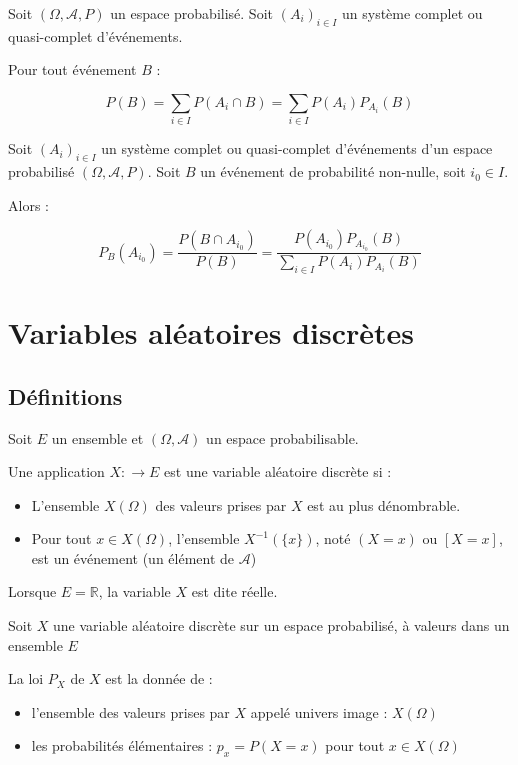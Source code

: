 \documentclass[a4paper,12pt]{book}
\newcommand{\Def}[2]{\begin{tcolorbox}[colback=white,colframe=red!10!green!20!blue!75!, title=Définition : #1]#2\end{tcolorbox}}
\newcommand{\Thr}[2]{\begin{tcolorbox}[sharp corners, colback=white,colframe=red!10!blue!30!green!75!, title=Théorème : #1]#2\end{tcolorbox}}
\def\R{\mathbb{R}}
\begin{document}
\Thr{Formule des probabilités totales}{Soit $(\Omega, \mathcal{A}, P)$ un espace probabilisé. Soit $(A_i)_{i\in I}$ un système complet ou quasi-complet d'événements.
\par Pour tout événement $B$ :
\par $$P(B)=\sum\limits_{i\in I}P(A_i\cap B)=\sum\limits_{i\in I}P(A_i)P_{A_i}(B)$$}
\Thr{Formule d'inversion de Bayes}{Soit $(A_i)_{i\in I}$ un système complet ou quasi-complet d'événements d'un espace probabilisé $(\Omega, \mathcal{A},P)$. Soit $B$ un événement de probabilité non-nulle, soit $i_0\in I$.
\par Alors :
\par $$P_B(A_{i_0})=\frac{P(B\cap A_{i_0})}{P(B)}=\frac{P(A_{i_0})P_{A_{i_0}}(B)}{\sum\limits_{i\in I}P(A_i)P_{A_i}(B)}$$}

\section{Variables aléatoires discrètes}
\subsection{Définitions}
\Def{}{Soit $E$ un ensemble et $(\Omega, \mathcal{A})$ un espace probabilisable.
\par Une application $X:\to E$ est une variable aléatoire discrète si :\begin{itemize}
\item L'ensemble $X(\Omega)$ des valeurs prises par $X$ est au plus dénombrable.
\item Pour tout $x\in X(\Omega)$, l'ensemble $X^{-1}(\{x\})$, noté $(X=x)$ ou $[X=x]$, est un événement (un élément de $\mathcal{A}$)
\end{itemize}
Lorsque $E=\R$, la variable $X$ est dite réelle.}
\Def{}{Soit $X$ une variable aléatoire discrète sur un espace probabilisé, à valeurs dans un ensemble $E$
\par La loi $P_X$ de $X$ est la donnée de :\begin{itemize}
\item l'ensemble des valeurs prises par $X$ appelé univers image : $X(\Omega)$
\item les probabilités élémentaires : $p_x = P(X=x)$ pour tout $x\in X(\Omega)$
\end{itemize}}
\end{document}
